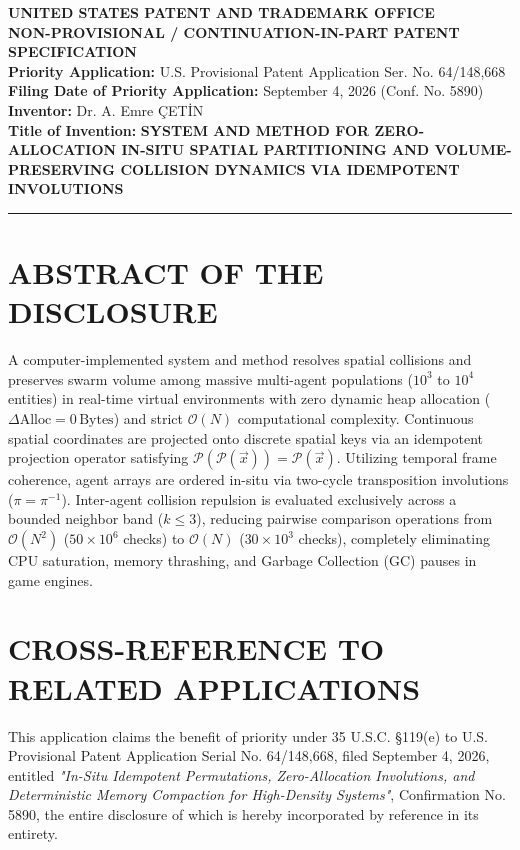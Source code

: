 \documentclass[11pt,a4paper]{article}
\begin{document}
\begin{center}
    {\Large \textbf{UNITED STATES PATENT AND TRADEMARK OFFICE}}\\[0.8em]
    {\large \textbf{NON-PROVISIONAL / CONTINUATION-IN-PART PATENT SPECIFICATION}}\\[1.5em]
    \textbf{Priority Application:} U.S. Provisional Patent Application Ser. No. 64/148,668\\
    \textbf{Filing Date of Priority Application:} September 4, 2026 (Conf. No. 5890)\\
    \textbf{Inventor:} Dr. A. Emre \c{C}ET\.{I}N\\
    \textbf{Title of Invention:} \textbf{SYSTEM AND METHOD FOR ZERO-ALLOCATION IN-SITU SPATIAL PARTITIONING AND VOLUME-PRESERVING COLLISION DYNAMICS VIA IDEMPOTENT INVOLUTIONS}
\end{center}

\vspace{1.5em}
\hrule
\vspace{1.5em}

\section*{ABSTRACT OF THE DISCLOSURE}
A computer-implemented system and method resolves spatial collisions and preserves swarm volume among massive multi-agent populations ($10^3$ to $10^4$ entities) in real-time virtual environments with zero dynamic heap allocation ($\Delta\text{Alloc} = 0\,\text{Bytes}$) and strict $\mathcal{O}(N)$ computational complexity. Continuous spatial coordinates are projected onto discrete spatial keys via an idempotent projection operator satisfying $\mathcal{P}(\mathcal{P}(\vec{x})) = \mathcal{P}(\vec{x})$. Utilizing temporal frame coherence, agent arrays are ordered in-situ via two-cycle transposition involutions ($\pi = \pi^{-1}$). Inter-agent collision repulsion is evaluated exclusively across a bounded neighbor band ($k \le 3$), reducing pairwise comparison operations from $\mathcal{O}(N^2)$ ($50 \times 10^6$ checks) to $\mathcal{O}(N)$ ($30 \times 10^3$ checks), completely eliminating CPU saturation, memory thrashing, and Garbage Collection (GC) pauses in game engines.

\section*{CROSS-REFERENCE TO RELATED APPLICATIONS}
This application claims the benefit of priority under 35 U.S.C. \S 119(e) to U.S. Provisional Patent Application Serial No. 64/148,668, filed September 4, 2026, entitled \textit{"In-Situ Idempotent Permutations, Zero-Allocation Involutions, and Deterministic Memory Compaction for High-Density Systems"}, Confirmation No. 5890, the entire disclosure of which is hereby incorporated by reference in its entirety.
\end{document}
